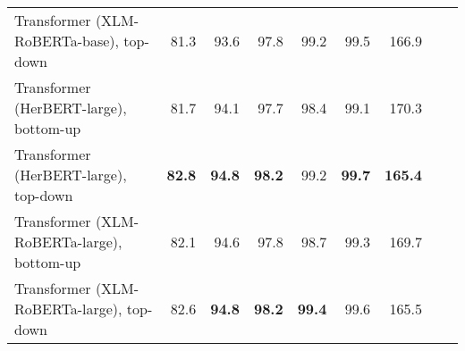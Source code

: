 \begin{table}[ht!]
{\begin{tabular}{lrrrrrrrr}
  Transformer (XLM-RoBERTa-base), top-down & 81.3 & 93.6 & 97.8 & 99.2 & 99.5 & 166.9 \\ 
  Transformer (HerBERT-large), bottom-up & 81.7 & 94.1 & 97.7 & 98.4 & 99.1 & 170.3 \\ 
  Transformer (HerBERT-large), top-down & \textbf{82.8} & \textbf{94.8} & \textbf{98.2} & 99.2 & \textbf{99.7} & \textbf{165.4} \\ 
  Transformer (XLM-RoBERTa-large), bottom-up & 82.1 & 94.6 & 97.8 & 98.7 & 99.3 & 169.7 \\ 
  Transformer (XLM-RoBERTa-large), top-down & 82.6 & \textbf{94.8} & \textbf{98.2} & \textbf{99.4} & 99.6 & 165.5 \\ 
   \hline
\end{tabular}
}
\end{table}




